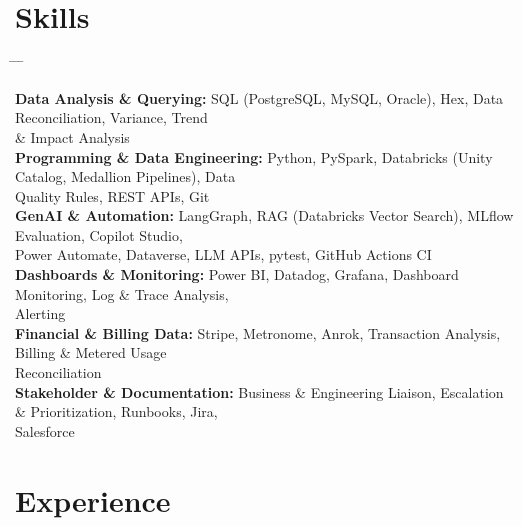 \documentclass[10pt, letterpaper]{article}
\begin{document}
    \section{Skills}
        \begin{tabbing}
    \hspace{5.8cm} \= \hspace{4cm} \= \hspace{4cm} \= \kill %

    \textbf{Data Analysis \& Querying:} \> SQL (PostgreSQL, MySQL, Oracle), Hex, Data Reconciliation, Variance, Trend\\ \> \& Impact Analysis\\

    \textbf{Programming \& Data Engineering:} \> Python, PySpark, Databricks (Unity Catalog, Medallion Pipelines), Data\\ \> Quality Rules, REST APIs, Git\\

    \textbf{GenAI \& Automation:} \> LangGraph, RAG (Databricks Vector Search), MLflow Evaluation, Copilot Studio,\\ \> Power Automate, Dataverse, LLM APIs, pytest, GitHub Actions CI\\

    \textbf{Dashboards \& Monitoring:} \> Power BI, Datadog, Grafana, Dashboard Monitoring, Log \& Trace Analysis,\\ \> Alerting\\

    \textbf{Financial \& Billing Data:} \> Stripe, Metronome, Anrok, Transaction Analysis, Billing \& Metered Usage\\ \> Reconciliation\\

    \textbf{Stakeholder \& Documentation:} \> Business \& Engineering Liaison, Escalation \& Prioritization, Runbooks, Jira,\\ \> Salesforce
\end{tabbing}

    \section{Experience}
\end{document}
